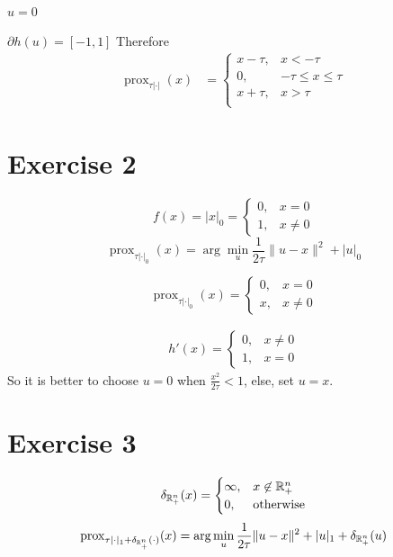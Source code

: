 \documentclass[12pt]{article}
\begin{document}
\paragraph{$u = 0$}
$\partial h(u) = [-1, 1]$
Therefore
\begin{align*}
  \operatorname{prox}_{\tau |\cdot|}(x)
   & = \begin{cases}
    x - \tau, & x < -\tau              \\
    0,        & -\tau \leq x \leq \tau \\
    x + \tau, & x > \tau               \\
  \end{cases}
\end{align*}

\section{Exercise 2}

\begin{equation}
  f(x) = |x|_0 = \begin{cases}
    0, & x = 0    \\
    1, & x \neq 0
  \end{cases}
\end{equation}
\begin{equation}
  \operatorname{prox}_{\tau |\cdot|_0}(x) = \arg\min_{u} \frac{1}{2\tau}\|u-x\|^2 + |u|_0
\end{equation}

\begin{equation}
  \operatorname{prox}_{\tau |\cdot|_0}(x) = \begin{cases}
    0, & x = 0    \\
    x, & x \neq 0
  \end{cases}
\end{equation}

\begin{align*}
  h'(x) = \begin{cases}
    0, & x \neq 0 \\
    1, & x = 0
  \end{cases}
\end{align*}
So it is better to choose $u = 0$ when $\frac{x^2}{2\tau} < 1$, else, set $u = x$.

\section{Exercise 3}
\begin{equation}
  \delta_{\mathbb{R}_+^n} (x) = \begin{cases}
    \infty, & x \not \in \mathbb{R}_+^n \\
    0,      & \text{otherwise}
  \end{cases}
\end{equation}
\begin{equation}
  \operatorname{prox}_{\tau |\cdot|_1 + \delta_{\mathbb{R}_+^n} (\cdot)}(x) = \arg\min_{u} \frac{1}{2\tau}\|u-x\|^2 + |u|_1 + \delta_{\mathbb{R}_+^n} (u)
\end{equation}
\end{document}
